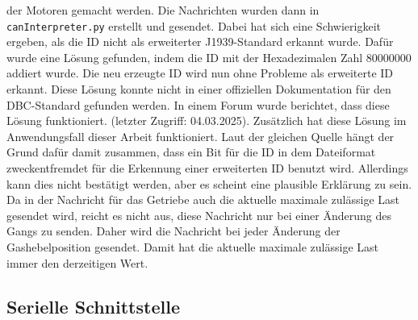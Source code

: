 der Motoren gemacht werden. Die Nachrichten wurden dann in \texttt{canInterpreter.py} erstellt und gesendet.
Dabei hat sich eine Schwierigkeit ergeben, als die ID nicht als erweiterter J1939-Standard erkannt wurde. 
Dafür wurde eine Lösung gefunden, indem die ID mit der Hexadezimalen Zahl 80000000 addiert wurde. Die neu erzeugte ID
wird nun ohne Probleme als erweiterte ID erkannt. Diese Lösung konnte nicht in einer offiziellen Dokumentation für den
DBC-Standard gefunden werden. In einem Forum wurde berichtet, dass diese Lösung funktioniert. \cite{cantoolsIssue} (letzter Zugriff: 04.03.2025).
Zusätzlich hat diese Lösung im Anwendungsfall dieser Arbeit funktioniert. 
Laut der gleichen Quelle hängt der Grund dafür damit zusammen, dass ein Bit für die ID in dem Dateiformat zweckentfremdet für
die Erkennung einer erweiterten ID benutzt wird. Allerdings kann dies nicht bestätigt werden, aber es scheint eine plausible
Erklärung zu sein. \\
Da in der Nachricht für das Getriebe auch die aktuelle maximale zulässige Last gesendet wird, reicht es nicht aus, diese
Nachricht nur bei einer Änderung des Gangs zu senden. Daher wird die Nachricht bei jeder Änderung der Gashebelposition
gesendet. Damit hat die aktuelle maximale zulässige Last immer den derzeitigen Wert.

\subsection{Serielle Schnittstelle}

